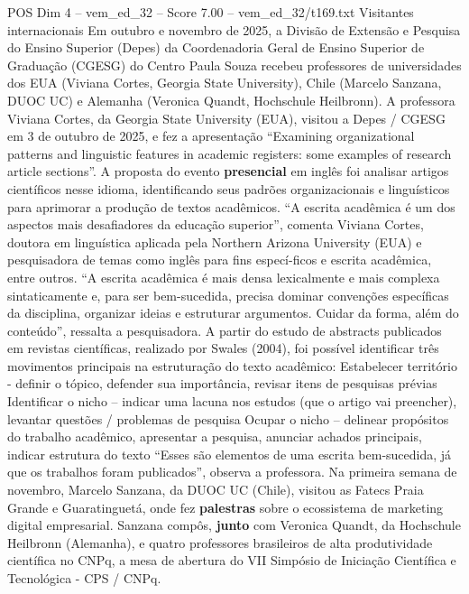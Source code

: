 \begin{textsample}{POS Dim 4 – vem\_ed\_32 – Score 7.00 – vem\_ed\_32/t169.txt}  \label{ex:f4_pos_031}
Visitantes internacionais Em outubro e novembro de 2025, a Divisão de Extensão e Pesquisa do Ensino Superior (Depes) da Coordenadoria Geral de Ensino Superior de Graduação (CGESG) do Centro Paula Souza recebeu professores de universidades dos EUA (Viviana Cortes, Georgia State University), Chile (Marcelo Sanzana, DUOC UC) e Alemanha (Veronica Quandt, Hochschule Heilbronn).
A professora Viviana Cortes, da Georgia State University (EUA), visitou a Depes / CGESG em 3 de outubro de 2025, e fez a apresentação “Examining organizational patterns and linguistic features in academic registers: some examples of research article sections”.
A proposta do evento \textbf{presencial} em inglês foi analisar artigos científicos nesse idioma, identificando seus padrões organizacionais e linguísticos para aprimorar a produção de textos acadêmicos. “A escrita acadêmica é um dos aspectos mais desafiadores da educação superior”, comenta Viviana Cortes, doutora em linguística aplicada pela Northern Arizona University (EUA) e pesquisadora de temas como inglês para fins especí-ficos e escrita acadêmica, entre outros. “A escrita acadêmica é mais densa lexicalmente e mais complexa sintaticamente e, para ser bem-sucedida, precisa dominar convenções específicas da disciplina, organizar ideias e estruturar argumentos.
Cuidar da forma, além do conteúdo”, ressalta a pesquisadora.
A partir do estudo de abstracts publicados em revistas científicas, realizado por Swales (2004), foi possível identificar três movimentos principais na estruturação do texto acadêmico: Estabelecer território - definir o tópico, defender sua importância, revisar itens de pesquisas prévias Identificar o nicho – indicar uma lacuna nos estudos (que o artigo vai preencher), levantar questões / problemas de pesquisa Ocupar o nicho – delinear propósitos do trabalho acadêmico, apresentar a pesquisa, anunciar achados principais, indicar estrutura do texto “Esses são elementos de uma escrita bem-sucedida, já que os trabalhos foram publicados”, observa a professora.
Na primeira semana de novembro, Marcelo Sanzana, da DUOC UC (Chile), visitou as Fatecs Praia Grande e Guaratinguetá, onde fez \textbf{palestras} sobre o ecossistema de marketing digital empresarial.
Sanzana compôs, \textbf{junto} com Veronica Quandt, da Hochschule Heilbronn (Alemanha), e quatro professores brasileiros de alta produtividade científica no CNPq, a mesa de abertura do VII Simpósio de Iniciação Científica e Tecnológica - CPS / CNPq.

\end{textsample}
